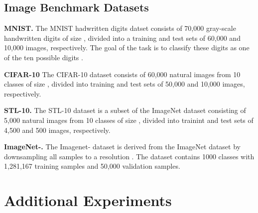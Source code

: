 \documentclass{article} \usepackage{iclr2022_conference,times}
\begin{document}
\subsection{Image Benchmark Datasets}\label{appx:image_datsets}

\textbf{MNIST.} The MNIST hadwritten digits datset \citep{lecun-mnisthandwrittendigit-2010} consists of 70,000 gray-scale handwritten digits of size , divided into a training and test sets of 60,000 and 10,000 images, respectively. The goal of the task is to classify these digits as one of the ten possible digits .

\textbf{CIFAR-10} The CIFAR-10 dataset \citep{krizhevsky2009learning} consists of 60,000 natural images from 10 classes of size , divided into training and test sets of 50,000 and 10,000 images, respectively.

\textbf{STL-10.} The STL-10 dataset \citep{coates2011analysis} is a subset of the ImageNet dataset \citep{krizhevsky_imagenet_2012} consisting of 5,000 natural images from 10 classes of size , divided into trainint and test sets of 4,500 and 500 images, respectively.

\textbf{ImageNet-.} The Imagenet- \citep{ChrabaszczLH17} dataset is derived from the ImageNet dataset \cite{ILSVRC15} by downsampling all samples to a resolution . The dataset contains 1000 classes with 1,281,167 training samples and 50,000 validation samples.

\section{Additional Experiments}
\label{sec:appx-experiments}
\begin{table}
\centering
\caption{Average PSNR for fitting of images in the Kodak dataset. Both our improved initialization scheme, as well as the inclusion of anisotropic Gabor functions lead to better reconstructions.}
\label{tab:kodak-results}
\begin{center}
\end{center}
\vspace{-2mm}
\end{table}
\end{document}
